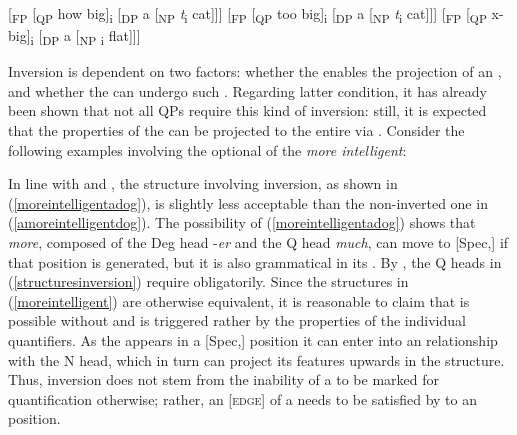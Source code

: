 \ea \label{structuresinversion}
\ea	{}[\textsubscript{FP} [\textsubscript{QP} how big]\textsubscript{i} [\textsubscript{DP} a [\textsubscript{NP} \emph{t}\textsubscript{i} cat]]]
\ex	{}[\textsubscript{FP} [\textsubscript{QP} too big]\textsubscript{i} [\textsubscript{DP} a [\textsubscript{NP} \emph{t}\textsubscript{i} cat]]]
\ex	{}[\textsubscript{FP} [\textsubscript{QP} x-big]\textsubscript{i} [\textsubscript{DP} a [\textsubscript{NP} \textit{}\textsubscript{i }flat]]]
\z
\z

Inversion is dependent on two factors: whether the  enables the projection of an , and whether the  can undergo such . Regarding latter condition, it has already been shown that not all QPs require this kind of inversion: still, it is expected that the properties of the  can be projected to the entire  via . Consider the following examples involving the optional  of the  \textit{more intelligent}:

\ea \label{moreintelligent}
 \label{amoreintelligentdog}
 \label{moreintelligentadog}
\z
\z

In line with \citet[130]{kennedymerchant2000} and \citet[287--288]{bresnan1973}, the structure involving inversion, as shown in (\ref{moreintelligentadog}), is slightly less acceptable than the non-inverted one in (\ref{amoreintelligentdog}). The possibility of (\ref{moreintelligentadog}) shows that \textit{more}, composed of the Deg head -\textit{er} and the Q head \textit{much}, can move to [Spec,] if that position is generated, but it is also grammatical in its . By , the Q heads in (\ref{structuresinversion}) require  obligatorily. Since the structures in (\ref{moreintelligent}) are otherwise equivalent, it is reasonable to claim that  is possible without  and  is triggered rather by the properties of the individual quantifiers. As the  appears in a [Spec,] position it can enter into an  relationship with the N head, which in turn can project its features upwards in the structure. Thus, inversion does not stem from the inability of a  to be marked for quantification otherwise; rather, an [\textsc{edge}]  of a  needs to be satisfied by  to an  position.

